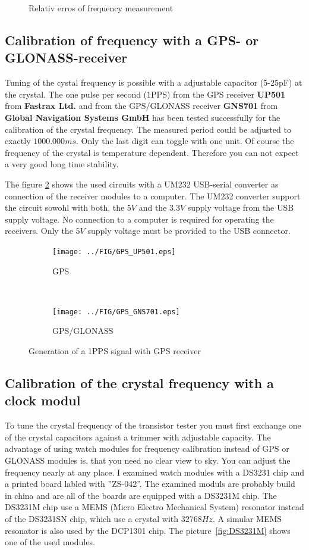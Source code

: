 \begin{figure}[H]
\centering

\caption{Relativ erros of frequency measurement}
\label{fig:freq-ppm}
\end{figure}

\subsection{Calibration of frequency with a GPS- or GLONASS-receiver}

Tuning of the cystal frequency is possible with a adjustable capacitor (5-25pF) at the crystal.
The one pulse per second (1PPS) from the GPS receiver {\bf UP501} from {\bf Fastrax Ltd.} and from the GPS/GLONASS receiver
{\bf GNS701} from {\bf Global Navigation Systems GmbH} has been tested successfully for the calibration of the
crystal frequency.
The measured period could be adjusted to exactly \(1000.000ms\).
Only the last digit can toggle with one unit.
Of course the frequency of the crystal is temperature dependent.
Therefore you can not expect a very good long time stability.

The figure \ref{fig:GPS-1PPS} shows the used circuits with a UM232 USB-serial converter
as connection of the receiver modules to a computer.
The UM232 converter support the circuit sowohl with both, the \(5V\) and the \(3.3V\) supply voltage
from the USB supply voltage.
No connection to a computer is required for operating the receivers.
Only the \(5V\) supply voltage must be provided to the USB connector.

\begin{figure}[H]
  \begin{subfigure}[b]{9cm}
    \centering
    \texttt{[image: ../FIG/GPS\_UP501.eps]}
    \caption{GPS}
  \end{subfigure}
  ~
  \begin{subfigure}[b]{9cm}
    \centering
    \texttt{[image: ../FIG/GPS\_GNS701.eps]}
    \caption{GPS/GLONASS}
  \end{subfigure}
  \caption{Generation of a 1PPS signal with GPS receiver }
  \label{fig:GPS-1PPS}
\end{figure}

\subsection{Calibration of the crystal frequency with a clock modul}

To tune the crystal frequency of the transistor tester you must first exchange one of the
crystal capacitors against a trimmer with adjustable capacity.
The advantage of using watch modules for frequency calibration instead of GPS or GLONASS modules is,
that you need no clear view to sky. You can adjust the frequency nearly at any place.
I examined watch modules with a DS3231 chip and a printed board labled with ''ZS-042''.
The examined moduls are probably build in china and are all of the boards are equipped
with a DS3231M chip. The DS3231M chip use a MEMS (Micro Electro Mechanical System) resonator 
instead of the DS3231SN chip, which use a crystal with \(32768Hz\).
A simular MEMS resonator is also used by the DCP1301 chip.
The picture~\ref{fig:DS3231M} shows one of the used modules.

